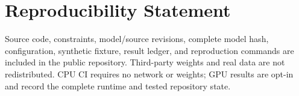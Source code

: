 \documentclass[10pt]{article}
\begin{document}
\section*{Reproducibility Statement}

Source code, constraints, model/source revisions, complete model hash,
configuration, synthetic fixture, result ledger, and reproduction commands are
included in the public repository.  Third-party weights and real data are not
redistributed.  CPU CI requires no network or weights; GPU results are opt-in and
record the complete runtime and tested repository state.



\end{document}

